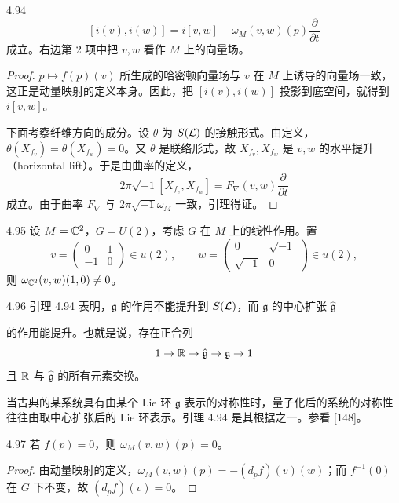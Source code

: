 \begin{lemma*}{4.94}
  \[
    [i(v),i(w)]=i[v,w]+\omega_M(v,w)(p)\frac{\partial}{\partial t}
  \]
  成立。右边第 2 项中把 $v,w$ 看作 $M$ 上的向量场。
\end{lemma*}

\begin{proof}
  $p\mapsto f(p)(v)$ 所生成的哈密顿向量场与 $v$ 在 $M$ 上诱导的向量场一致，这正是动量映射的定义本身。因此，把 $[i(v),i(w)]$ 投影到底空间，就得到 $i[v,w]$。

  下面考察纤维方向的成分。设 $\theta$ 为 $S(\mathcal{L})$ 的接触形式。由定义，$\theta(X_{f_v})=\theta(X_{f_w})=0$。又 $\theta$ 是联络形式，故 $X_{f_v},X_{f_w}$ 是 $v,w$ 的水平提升（horizontal lift）。于是由曲率的定义，
  \[
    2\pi\sqrt{-1}[X_{f_v},X_{f_w}]=F_\nabla(v,w)\frac{\partial}{\partial t}
  \]
  成立。由于曲率 $F_\nabla$ 与 $2\pi\sqrt{-1}\omega_M$ 一致，引理得证。
\end{proof}

\begin{example}{4.95}
  设 $M=\mathbb{C}^2$，$G=U(2)$，考虑 $G$ 在 $M$ 上的线性作用。置
  \[
    v=\begin{pmatrix}0&1\\-1&0\end{pmatrix}\in u(2),\qquad
    w=\begin{pmatrix}0&\sqrt{-1}\\\sqrt{-1}&0\end{pmatrix}\in u(2),
  \]
  则 $\omega_{\mathbb{C}^2}(v,w)(1,0)\ne 0$。
\end{example}

\begin{remark}{4.96}
  引理 4.94 表明，$\mathfrak{g}$ 的作用不能提升到 $S(\mathcal{L})$，而 $\mathfrak{g}$ 的中心扩张 $\hat{\mathfrak{g}}$

  的作用能提升。也就是说，存在正合列
  \[
    1\to\mathbb{R}\to\hat{\mathfrak{g}}\to\mathfrak{g}\to 1
  \]
  且 $\mathbb{R}$ 与 $\hat{\mathfrak{g}}$ 的所有元素交换。

  当古典的某系统具有由某个 Lie 环 $\mathfrak{g}$ 表示的对称性时，量子化后的系统的对称性往往由取中心扩张后的 Lie 环表示。引理 4.94 是其根据之一。参看 [148]。
\end{remark}

\begin{lemma*}{4.97}
  若 $f(p)=0$，则 $\omega_M(v,w)(p)=0$。
\end{lemma*}

\begin{proof}
  由动量映射的定义，$\omega_M(v,w)(p)=-(d_pf)(v)(w)$；而 $f^{-1}(0)$ 在 $G$ 下不变，故 $(d_pf)(v)=0$。
\end{proof}

